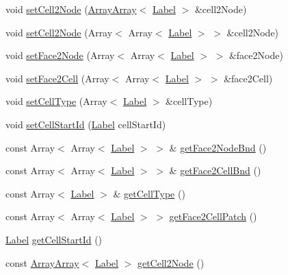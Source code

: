 \begin{DoxyCompactItemize}
void \hyperlink{classHSF_1_1Topology_a6a372d4d321126c3626c27f777753729}{setCell2Node} (\hyperlink{classHSF_1_1ArrayArray}{ArrayArray}$<$ \hyperlink{namespaceHSF_ae65d72be782e989396ebe5ec6ae4c2b6}{Label} $>$ \&cell2Node)
\item 
void \hyperlink{classHSF_1_1Topology_a947e781930ba1bbf355970af289e35ba}{setCell2Node} (Array$<$ Array$<$ \hyperlink{namespaceHSF_ae65d72be782e989396ebe5ec6ae4c2b6}{Label} $>$ $>$ \&cell2Node)
\item 
void \hyperlink{classHSF_1_1Topology_ad5dc6fbfb70d53bc41c616b747f5b9a4}{setFace2Node} (Array$<$ Array$<$ \hyperlink{namespaceHSF_ae65d72be782e989396ebe5ec6ae4c2b6}{Label} $>$ $>$ \&face2Node)
\item 
void \hyperlink{classHSF_1_1Topology_a61f5c30ee928367a573f8b4b139ecd8f}{setFace2Cell} (Array$<$ Array$<$ \hyperlink{namespaceHSF_ae65d72be782e989396ebe5ec6ae4c2b6}{Label} $>$ $>$ \&face2Cell)
\item 
void \hyperlink{classHSF_1_1Topology_a42c3fe3a125b6b4576aeea273a9c849c}{setCellType} (Array$<$ \hyperlink{namespaceHSF_ae65d72be782e989396ebe5ec6ae4c2b6}{Label} $>$ \&cellType)
\item 
void \hyperlink{classHSF_1_1Topology_a531b20b476fb3cfc39526e949f20bb27}{setCellStartId} (\hyperlink{namespaceHSF_ae65d72be782e989396ebe5ec6ae4c2b6}{Label} cellStartId)
\item 
const Array$<$ Array$<$ \hyperlink{namespaceHSF_ae65d72be782e989396ebe5ec6ae4c2b6}{Label} $>$ $>$ \& \hyperlink{classHSF_1_1Topology_afda78d036de3096e8da7fe88705b2371}{getFace2NodeBnd} ()
\item 
const Array$<$ Array$<$ \hyperlink{namespaceHSF_ae65d72be782e989396ebe5ec6ae4c2b6}{Label} $>$ $>$ \& \hyperlink{classHSF_1_1Topology_a44ed8e5128084d2385a0dfa8f0fb525c}{getFace2CellBnd} ()
\item 
const Array$<$ \hyperlink{namespaceHSF_ae65d72be782e989396ebe5ec6ae4c2b6}{Label} $>$ \& \hyperlink{classHSF_1_1Topology_a1450bccac8167a83983fc8e91a1a68cf}{getCellType} ()
\item 
const Array$<$ Array$<$ \hyperlink{namespaceHSF_ae65d72be782e989396ebe5ec6ae4c2b6}{Label} $>$ $>$ \hyperlink{classHSF_1_1Topology_a89d020dbaa3624a7b01d10e0c3249f28}{getFace2CellPatch} ()
\item 
\hyperlink{namespaceHSF_ae65d72be782e989396ebe5ec6ae4c2b6}{Label} \hyperlink{classHSF_1_1Topology_ac1ec1876bb50ca29391873e550b11efa}{getCellStartId} ()
\item 
const \hyperlink{classHSF_1_1ArrayArray}{ArrayArray}$<$ \hyperlink{namespaceHSF_ae65d72be782e989396ebe5ec6ae4c2b6}{Label} $>$ \hyperlink{classHSF_1_1Topology_a4773996f5f708d964b87256318266497}{getCell2Node} ()

\end{DoxyCompactItemize}
